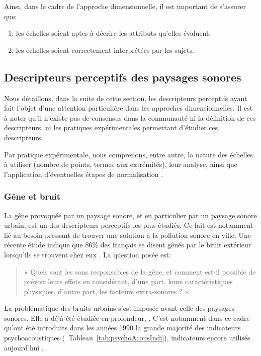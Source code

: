 Ainsi, dans le cadre de l'approche dimensionnelle, il est important de s'assurer que:

\begin{enumerate}
\item les échelles soient aptes à décrire les attributs qu'elles évaluent;
\item les échelles soient correctement interprétées par les sujets.
\end{enumerate}

\subsection{Descripteurs perceptifs des paysages sonores}
\label{sec:descripteursPercetifs}

Nous détaillons, dans la suite de cette section, les descripteurs perceptifs ayant fait l'objet d'une attention particulière dans les approches dimensionnelles. Il est à noter qu'il n'existe pas de consensus dans la communauté ni la définition de ces descripteurs, ni les pratiques expérimentales permettant d'étudier ces descripteurs.

Par pratique expérimentale, nous comprenons, entre autre, la nature des échelles à utiliser (nombre de points, termes aux extrémités), leur analyse, ainsi que l'application d'éventuelles étapes de normalisation \citep{aletta2016soundscape}.

\subsubsection{Gêne et bruit}

La gêne provoquée par un paysage sonore, et en particulier par un paysage sonore urbain, est un des descripteurs perceptifs les plus étudiés. Ce fait est notamment lié au besoin pressant de trouver une solution à la pollution sonore en ville. Une récente étude indique que 86\% des français se disent gênés par le bruit extérieur lorsqu'ils se trouvent chez eux \citep{noiseFrench}. La question posée est: \\

\begin{quote}
« Quels sont les sons responsables de la gêne, et comment est-il possible de prévoir leurs effets en considérant, d'une part, leurs caractéristiques physiques, d'autre part, les facteurs extra-sonores ? ».
\end{quote}

La problématique des bruits urbains s'est imposée avant celle des paysages sonores. Elle a déjà été étudiée en profondeur, \citep{marquis2005noisea,marquis2005noiseb}. C'est notamment dans ce cadre qu'ont été introduits dans les années 1990 la grande majorité des indicateurs psychoacoustiques \citep{zwicker2013psychoacoustics}(\cf~Tableau~\ref{tab:psychoAcousIndi}), indicateurs encore utilisés aujourd'hui \citep{hall2013exploratory,fiebig2009psychoacoustic,yang2013psychoacoustical}.

